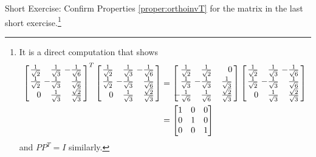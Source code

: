 Short Exercise: Confirm Properties \ref{proper:orthoinvT} for the matrix in the last short exercise.\footnote{It is a direct computation that shows
\begin{align*}
\left[\begin{array}{@{}wr{14pt}wr{14pt}wr{14pt}@{\,}}
\frac{1}{\sqrt{2}} & \frac{1}{\sqrt{3}} & -\frac{1}{\sqrt{6}} \\
\frac{1}{\sqrt{2}} & -\frac{1}{\sqrt{3}} & \frac{1}{\sqrt{6}} \\
0 & \frac{1}{\sqrt{3}} & \frac{\sqrt{2}}{\sqrt{3}}
\end{array}\right]^T
\left[\begin{array}{@{}wr{14pt}wr{14pt}wr{14pt}@{\,}}
\frac{1}{\sqrt{2}} & \frac{1}{\sqrt{3}} & -\frac{1}{\sqrt{6}} \\
\frac{1}{\sqrt{2}} & -\frac{1}{\sqrt{3}} & \frac{1}{\sqrt{6}} \\
0 & \frac{1}{\sqrt{3}} & \frac{\sqrt{2}}{\sqrt{3}}
\end{array}\right] &=
\left[\begin{array}{@{\,}wr{14pt}wr{14pt}wr{14pt}@{\,}}
\frac{1}{\sqrt{2}} & \frac{1}{\sqrt{2}} & 0 \\
\frac{1}{\sqrt{3}} & -\frac{1}{\sqrt{3}} & \frac{1}{\sqrt{3}} \\
-\frac{1}{\sqrt{6}} & \frac{1}{\sqrt{6}} & \frac{\sqrt{2}}{\sqrt{3}}
\end{array}\right]
\left[\begin{array}{@{}wr{14pt}wr{14pt}wr{14pt}@{\,}}
\frac{1}{\sqrt{2}} & \frac{1}{\sqrt{3}} & -\frac{1}{\sqrt{6}} \\
\frac{1}{\sqrt{2}} & -\frac{1}{\sqrt{3}} & \frac{1}{\sqrt{6}} \\
0 & \frac{1}{\sqrt{3}} & \frac{\sqrt{2}}{\sqrt{3}}
\end{array}\right] \\
&=
\begin{bmatrix}
1 & 0 & 0 \\
0 & 1 & 0 \\
0 & 0 & 1
\end{bmatrix}
\end{align*}
and $PP^T = I$ similarly.}

